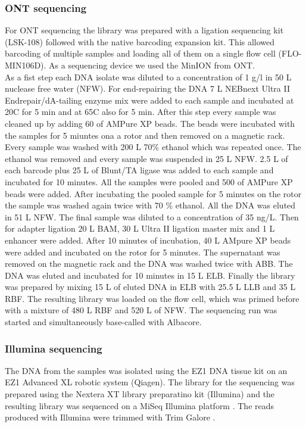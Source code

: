 \subsubsection{ONT sequencing}
For ONT sequencing the library was prepared with a ligation sequencing kit (LSK-108) followed with the native barcoding expansion kit. This allowed barcoding of multiple samples and loading all of them on a single flow cell (FLO-MIN106D). As a sequencing device we used the MinION from ONT. \\
As a fist step each DNA isolate was diluted to a concentration of 1 \textmu g/\textmu l in 50 \textmu L nuclease free water (NFW). For end-repairing the DNA 7 \textmu L NEBnext Ultra II Endrepair/dA-tailing enzyme mix were added to each
sample and incubated at 20\degree C for 5 min and at 65\degree C also for 5 min. After this step every sample was cleaned up by adding 60 \textmu of AMPure XP beads. The beads were incubated with the samples for 5 miuntes ona a rotor and then removed on a magnetic rack. Every sample was washed with 200 \textmu L 70\% ethanol which was repeated once. The ethanol was removed and every sample was suspended in 25 \textmu L NFW. 2.5 \textmu L of each barcode plus 25 \textmu L of Blunt/TA ligase was added to each sample and incubated for 10 minutes. All the samples were pooled and 500 \textmu of AMPure XP beads were added. After incubating the pooled sample for 5 minutes on the rotor the sample was washed again twice with 70 \% ethanol. All the DNA was eluted in 51 \textmu L NFW. The final sample was diluted to a concentration of 35 ng/\textmu L. Then for adapter ligation 20 \textmu L BAM, 30 \textmu L Ultra II ligation master mix and 1 \textmu L enhancer were added. After 10 minutes of incubation, 40 \textmu L AMpure XP beads were added and incubated on the rotor for 5 minutes. The supernatant was removed on the magnetic rack and the DNA was washed twice with ABB. The DNA was eluted and incubated for 10 minutes in 15 \textmu L ELB. Finally the library was prepared by mixing 15 \textmu L of eluted DNA in ELB with 25.5 \textmu L LLB and 35 \textmu L RBF. The resulting library was loaded on the flow cell, which was primed before with a mixture of 480 \textmu L RBF  and 520 \textmu L of NFW. The sequencing run was started and simultaneously base-called with Albacore.
\label{section:nanopore_sequenicng}

\subsubsection{Illumina sequencing}
The DNA from the samples was isolated using the EZ1 DNA tissue kit on an EZ1 Advanced XL robotic system (Qiagen). The library for the sequencing was prepared using the Nextera XT library preparatino kit (Illumina) and the resulting library was sequenced on a MiSeq Illumina platform \cite{nanopore}. The reads produced with Illumina were trimmed with Trim Galore \cite{noauthor_babraham_nodate}.
\label{section:illumina}

